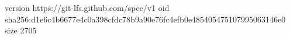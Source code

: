 version https://git-lfs.github.com/spec/v1
oid sha256:d1e6c4b6677e4c0a398cfdc78b9a90e76fc4efb0e485405475107995063146e0
size 2705
